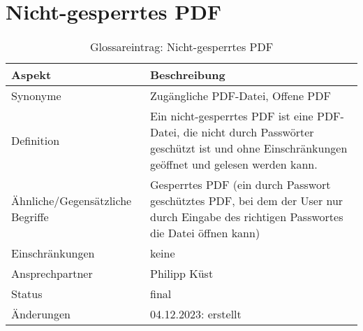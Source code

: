 \section*{Nicht-gesperrtes PDF}\label{sec:glossar_nicht_gesperrtes_pdf}
\begin{table}[H]
    \label{tab:glossar_nicht_gesperrtes_pdf}
    \begin{tabularx}{\textwidth}{|l|X|}
        \hline
        \textbf{Aspekt}                  & \textbf{Beschreibung}                                                                                                                            \\
        \hline
        Synonyme                         & Zugängliche PDF-Datei, Offene PDF                                                                                                                \\
        \hline
        Definition                       & Ein nicht-gesperrtes PDF ist eine PDF-Datei, die nicht durch Passwörter geschützt ist und ohne Einschränkungen geöffnet und gelesen werden kann. \\
        \hline
        Ähnliche/Gegensätzliche Begriffe & Gesperrtes PDF (ein durch Passwort geschütztes PDF, bei dem der User nur durch Eingabe des richtigen Passwortes die Datei öffnen kann)           \\
        \hline
        Einschränkungen                  & keine                                                                                                                                            \\
        \hline
        Ansprechpartner                  & Philipp Küst                                                                                                                                     \\
        \hline
        Status                           & final                                                                                                                                            \\
        \hline
        Änderungen                       & 04.12.2023: erstellt                                                                                                                             \\
        \hline
    \end{tabularx}
    \caption{Glossareintrag: Nicht-gesperrtes PDF}
\end{table}



